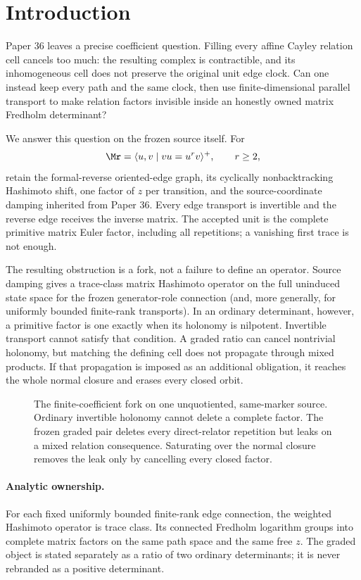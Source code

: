 \section{Introduction}

Paper 36 leaves a precise coefficient question.  Filling every affine Cayley
relation cell cancels too much: the resulting complex is contractible, and its
inhomogeneous cell does not preserve the original unit edge clock.  Can one
instead keep every path and the same clock, then use finite-dimensional
parallel transport to make relation factors invisible inside an honestly
owned matrix Fredholm determinant?

We answer this question on the frozen source itself.  For
\[
  \Mr=\langle u,v\mid vu=u^rv\rangle^+,
  \qquad r\ge2,
\]
retain the formal-reverse oriented-edge graph, its cyclically
nonbacktracking Hashimoto shift, one factor of $z$ per transition, and the
source-coordinate damping inherited from Paper 36.  Every edge transport is
invertible and the reverse edge receives the inverse matrix.  The accepted
unit is the complete primitive matrix Euler factor, including all repetitions;
a vanishing first trace is not enough.

The resulting obstruction is a fork, not a failure to define an operator.
Source damping gives a trace-class matrix Hashimoto operator on the full
uninduced state space for the frozen generator-role connection (and, more
generally, for uniformly bounded finite-rank transports).  In an ordinary
determinant, however, a primitive factor is one exactly when its holonomy is
nilpotent.  Invertible transport
cannot satisfy that condition.  A graded ratio can cancel nontrivial
holonomy, but matching the defining cell does not propagate through mixed
products.  If that propagation is imposed as an additional obligation, it
reaches the whole normal closure and erases every closed orbit.

\begin{figure}[t]
  \centering
  \resizebox{0.96\textwidth}{!}{}
  \caption{The finite-coefficient fork on one unquotiented, same-marker
  source.  Ordinary invertible holonomy cannot delete a complete factor.  The
  frozen graded pair deletes every direct-relator repetition but leaks on a
  mixed relation consequence.  Saturating over the normal closure removes the
  leak only by cancelling every closed factor.}
  \label{fig:coefficient-fork}
\end{figure}

\paragraph{Analytic ownership.}
For each fixed uniformly bounded finite-rank edge connection, the weighted
Hashimoto operator is trace class.  Its connected Fredholm logarithm groups
into complete matrix factors on the same path space and the same free $z$.
The graded object is
stated separately as a ratio of two ordinary determinants; it is never
rebranded as a positive determinant.

